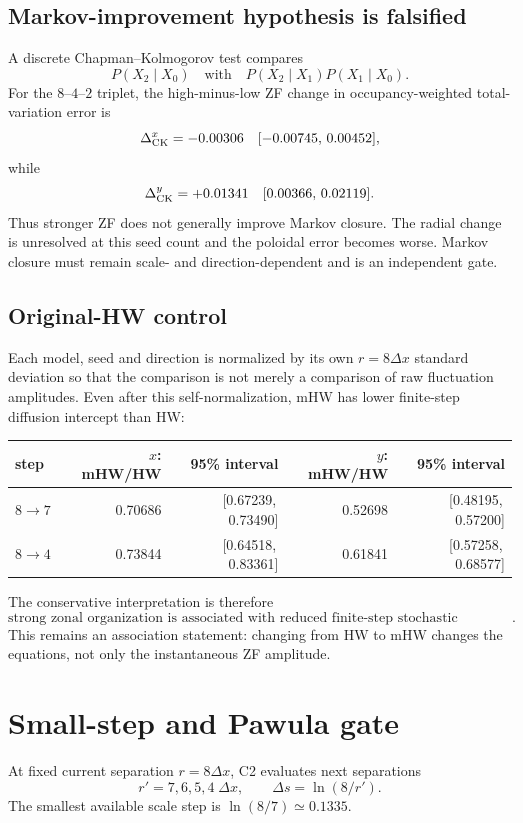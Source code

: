 \documentclass[11pt,a4paper]{article}
\begin{document}
\subsection{Markov-improvement hypothesis is falsified}
A discrete Chapman--Kolmogorov test compares
\[
P(X_2\mid X_0)
\quad\text{with}\quad
P(X_2\mid X_1)P(X_1\mid X_0).
\]
For the $8$--$4$--$2$ triplet, the high-minus-low ZF change in occupancy-weighted total-variation error is
\[
\Delta_{\rm CK}^{x}=-0.00306
\quad [ -0.00745,\,0.00452],
\]
while
\[
\Delta_{\rm CK}^{y}=+0.01341
\quad [0.00366,\,0.02119].
\]
Thus stronger ZF does not generally improve Markov closure. The radial change is unresolved at this seed count and the poloidal error becomes worse. Markov closure must remain scale- and direction-dependent and is an independent gate.

\subsection{Original-HW control}
Each model, seed and direction is normalized by its own $r=8\Delta x$ standard deviation so that the comparison is not merely a comparison of raw fluctuation amplitudes. Even after this self-normalization, mHW has lower finite-step diffusion intercept than HW:
\begin{center}
\begin{tabular}{lrrrr}
\toprule
step & $x$: mHW/HW & 95\% interval & $y$: mHW/HW & 95\% interval\\
\midrule
$8\to7$ & 0.70686 & [0.67239,\,0.73490] & 0.52698 & [0.48195,\,0.57200]\\
$8\to4$ & 0.73844 & [0.64518,\,0.83361] & 0.61841 & [0.57258,\,0.68577]\\
\bottomrule
\end{tabular}
\end{center}
The conservative interpretation is therefore
\[
\boxed{\text{strong zonal organization is associated with reduced finite-step
stochastic spreading of the nonzonal scale process}.}
\]
This remains an association statement: changing from HW to mHW changes the equations, not only the instantaneous ZF amplitude.

\section{Small-step and Pawula gate}
At fixed current separation $r=8\Delta x$, C2 evaluates next separations
\[
r'=7,6,5,4\;\Delta x,
\qquad
\Delta s=\ln(8/r').
\]
The smallest available scale step is $\ln(8/7)\simeq0.1335$.
\end{document}
